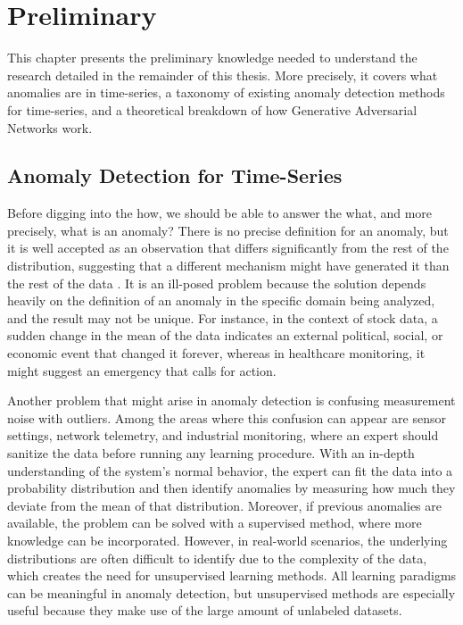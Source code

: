 \chapter{Preliminary}
\label{chap:02-preliminary}

This chapter presents the preliminary knowledge needed to understand the research detailed in the remainder of this thesis. More precisely, it covers what anomalies are in time-series, a taxonomy of existing anomaly detection methods for time-series, and a theoretical breakdown of how Generative Adversarial Networks work.

\section{Anomaly Detection for Time-Series}
\label{sec:ad-for-ts}
Before digging into the how, we should be able to answer the what, and more precisely, what is an anomaly? There is no precise definition for an anomaly, but it is well accepted as an observation that differs significantly from the rest of the distribution, suggesting that a different mechanism might have generated it than the rest of the data \cite{hawkins1980iden_outliers}. It is an ill-posed problem because the solution depends heavily on the definition of an anomaly in the specific domain being analyzed, and the result may not be unique. For instance, in the context of stock data, a sudden change in the mean of the data indicates an external political, social, or economic event that changed it forever, whereas in healthcare monitoring, it might suggest an emergency that calls for action. 

Another problem that might arise in anomaly detection is confusing measurement noise with outliers. Among the areas where this confusion can appear are sensor settings, network telemetry, and industrial monitoring, where an expert should sanitize the data before running any learning procedure. With an in-depth understanding of the system's normal behavior, the expert can fit the data into a probability distribution and then identify anomalies by measuring how much they deviate from the mean of that distribution. Moreover, if previous anomalies are available, the problem can be solved with a supervised method, where more knowledge can be incorporated. However, in real-world scenarios, the underlying distributions are often difficult to identify due to the complexity of the data, which creates the need for unsupervised learning methods. All learning paradigms can be meaningful in anomaly detection, but unsupervised methods are especially useful because they make use of the large amount of unlabeled datasets.  

